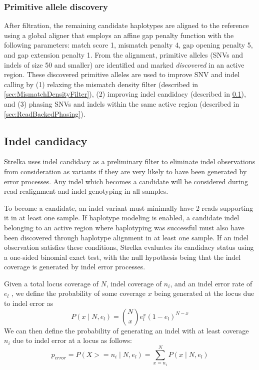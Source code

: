 \documentclass{article}
\begin{document}
\subsubsection{Primitive allele discovery}
After filtration, the remaining candidate haplotypes are aligned to the reference using a global aligner that employs an affine gap penalty function with the following parameters: match score 1, mismatch penalty 4, gap opening penalty 5, and gap extension penalty 1. From the alignment, primitive alleles (SNVs and indels of size 50 and smaller) are identified and marked {\em discovered} in an active region. These discovered primitive alleles are used to improve SNV and indel calling by (1) relaxing the mismatch density filter (described in \ref{sec:MismatchDensityFilter}), (2) improving indel candidacy (described in \ref{sec:IndelCandidacy}), and (3) phasing SNVs and indels within the same active region (described in \ref{sec:ReadBackedPhasing}).

\subsection{Indel candidacy}
\label{sec:IndelCandidacy}

Strelka uses indel candidacy as a preliminary filter to eliminate indel observations from consideration as variants if they are very likely to have been generated by error processes. Any indel which becomes a candidate will be considered during read realignment and indel genotyping in all samples.

To become a candidate, an indel variant must minimally have 2 reads supporting it in at least one sample. If haplotype modeling is enabled, a candidate indel belonging to an active region where haplotyping was successful must also have been discovered through haplotype alignment in at least one sample. If an indel observation satisfies these conditions, Strelka evaluates its candidacy status using a one-sided binomial exact test, with the null hypothesis being that the indel coverage is generated by indel error processes.

Given a total locus coverage of $N$, indel coverage of $n_i$, and an indel error rate of $e_l$ , we define the probability of some coverage $x$ being generated at the locus due to indel error as
\begin{equation*}
P(x \mid N, e_l) = \binom {N} {x} e^{x}_l (1 - e_l)^{N - x}
\end{equation*}
We can then define the probability of generating an indel with at least coverage $n_i$ due to indel error at a locus as follows:
\begin{equation*}
p_{error} = P(X >= n_i \mid N, e_l) = \sum_{x = n_i}^{N} P(x \mid N, e_l)
\end{equation*}
\end{document}
